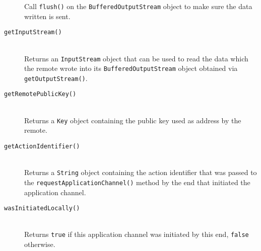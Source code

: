 \documentclass[a4paper,twoside,DIV=12,BCOR=1cm]{scrartcl}
\newcommand{\code}[1]{\texttt{#1}}
\begin{document}
\begin{multicols}{2}
\begin{description}
        Call \code{flush()} on the \code{Buffered\-Output\-Stream} object to make
        sure the data written is sent.

    \item[{\code{getInputStream()}}] \hfill \\
        Returns an \code{Input\-Stream} object that can be used to read the data
        which the remote wrote into its \code{Buffered\-Output\-Stream} object
        obtained via \code{get\-Output\-Stream()}.

    \item[{\code{getRemotePublicKey()}}] \hfill \\
        Returns a \code{Key} object containing the public key used as address
        by the remote.

    \item[{\code{getActionIdentifier()}}] \hfill \\
        Returns a \code{String} object containing the action identifier that was
        passed to the \code{request\-Application\-Channel()} method by the end that
        initiated the application channel.

    \item[{\code{wasInitiatedLocally()}}] \hfill \\
        Returns \code{true} if this application channel was initiated by this
        end, \code{false} otherwise.

\end{description}
\end{multicols} 
\end{document}
